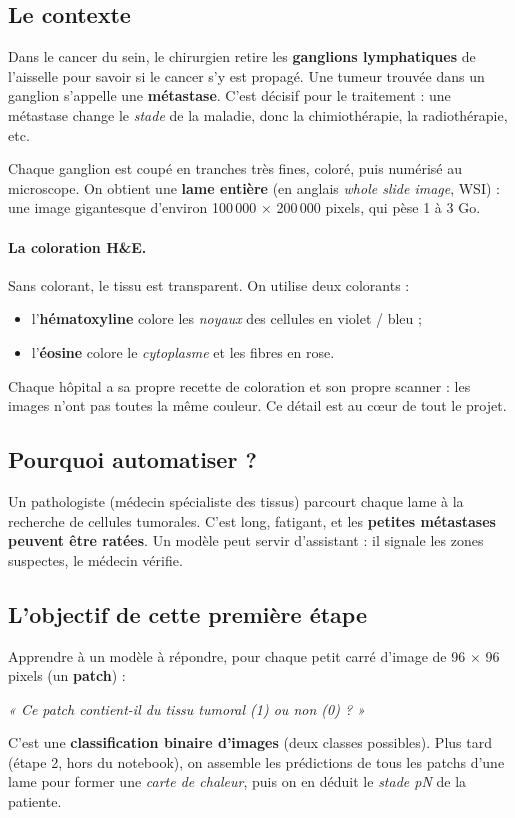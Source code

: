 \documentclass[11pt,a4paper]{article}
\begin{document}
\subsection{Le contexte}
Dans le cancer du sein, le chirurgien retire les \textbf{ganglions lymphatiques} de l'aisselle pour savoir si
le cancer s'y est propagé. Une tumeur trouvée dans un ganglion s'appelle une \textbf{métastase}. C'est
décisif pour le traitement : une métastase change le \emph{stade} de la maladie, donc la chimiothérapie,
la radiothérapie, etc.

Chaque ganglion est coupé en tranches très fines, coloré, puis numérisé au microscope. On obtient une
\textbf{lame entière} (en anglais \emph{whole slide image}, WSI) : une image gigantesque d'environ
100\,000 × 200\,000 pixels, qui pèse 1 à 3 Go.

\paragraph{La coloration H\&E.} Sans colorant, le tissu est transparent. On utilise deux colorants :
\begin{itemize}
  \item l'\textbf{hématoxyline} colore les \emph{noyaux} des cellules en violet / bleu ;
  \item l'\textbf{éosine} colore le \emph{cytoplasme} et les fibres en rose.
\end{itemize}
Chaque hôpital a sa propre recette de coloration et son propre scanner : les images n'ont pas toutes la même
couleur. Ce détail est au cœur de tout le projet.

\subsection{Pourquoi automatiser ?}
Un pathologiste (médecin spécialiste des tissus) parcourt chaque lame à la recherche de cellules tumorales.
C'est long, fatigant, et les \textbf{petites métastases peuvent être ratées}. Un modèle peut servir
d'assistant : il signale les zones suspectes, le médecin vérifie.

\subsection{L'objectif de cette première étape}
Apprendre à un modèle à répondre, pour chaque petit carré d'image de 96 × 96 pixels (un \textbf{patch}) :
\begin{center}
\textit{« Ce patch contient-il du tissu tumoral (1) ou non (0) ? »}
\end{center}
C'est une \textbf{classification binaire d'images} (deux classes possibles).
Plus tard (étape 2, hors du notebook), on assemble les prédictions de tous les patchs d'une lame pour former
une \emph{carte de chaleur}, puis on en déduit le \emph{stade pN} de la patiente.
\end{document}

